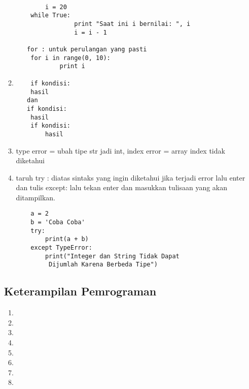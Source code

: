 \begin{enumerate}
\begin{enumerate}
   \begin{verbatim}

     	i = 20
	while True:
        		print "Saat ini i bernilai: ", i
        		i = i - 1
   
   for : untuk perulangan yang pasti
	for i in range(0, 10):
    		print i
    \end{verbatim}
    \item 
    \begin{verbatim}
    if kondisi:
	hasil
   dan
   if kondisi:
	hasil
	if kondisi:
	    hasil
	\end{verbatim}
	\item type error = ubah tipe str jadi int, index error = array index tidak diketahui

	\item taruh try : diatas sintaks yang ingin diketahui jika terjadi error lalu enter dan tulis except: lalu tekan enter 
dan masukkan tulisaan yang akan ditampilkan.
	\begin{verbatim}
	a = 2
	b = 'Coba Coba'
	try:
    	print(a + b)
	except TypeError:
    	print("Integer dan String Tidak Dapat
    	 Dijumlah Karena Berbeda Tipe")
	\end{verbatim}

\end{enumerate}
\subsection{Keterampilan Pemrograman}
\begin{enumerate}
	\item 

	\item 

	\item 

	\item 

	\item 

	\item 

	\item 

	\item 


\end{enumerate}
\end{enumerate}
